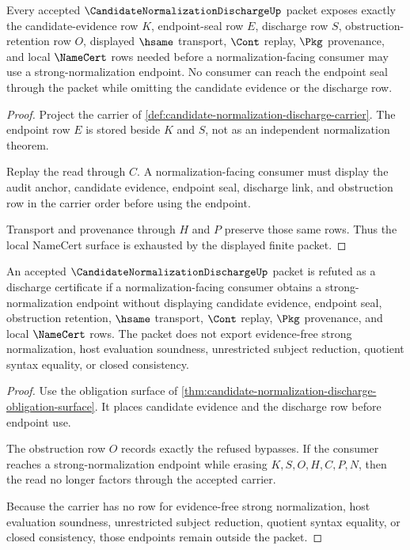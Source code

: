 \begin{theorem}
\label{thm:candidate-normalization-discharge-obligation-surface}
Every accepted $\CandidateNormalizationDischargeUp$ packet exposes exactly the candidate-evidence row $K$, endpoint-seal row $E$, discharge row $S$, obstruction-retention row $O$, displayed $\hsame$ transport, $\Cont$ replay, $\Pkg$ provenance, and local $\NameCert$ rows needed before a normalization-facing consumer may use a strong-normalization endpoint. No consumer can reach the endpoint seal through the packet while omitting the candidate evidence or the discharge row.
\end{theorem}
\begin{proof}
Project the carrier of \autoref{def:candidate-normalization-discharge-carrier}. The endpoint row $E$ is stored beside $K$ and $S$, not as an independent normalization theorem.

Replay the read through $C$. A normalization-facing consumer must display the audit anchor, candidate evidence, endpoint seal, discharge link, and obstruction row in the carrier order before using the endpoint.

Transport and provenance through $H$ and $P$ preserve those same rows. Thus the local NameCert surface is exhausted by the displayed finite packet.
\end{proof}

\begin{theorem}
\label{thm:candidate-normalization-discharge-endpoint-seal-nonescape}
An accepted $\CandidateNormalizationDischargeUp$ packet is refuted as a discharge certificate if a normalization-facing consumer obtains a strong-normalization endpoint without displaying candidate evidence, endpoint seal, obstruction retention, $\hsame$ transport, $\Cont$ replay, $\Pkg$ provenance, and local $\NameCert$ rows. The packet does not export evidence-free strong normalization, host evaluation soundness, unrestricted subject reduction, quotient syntax equality, or closed consistency.
\end{theorem}
\begin{proof}
Use the obligation surface of \autoref{thm:candidate-normalization-discharge-obligation-surface}. It places candidate evidence and the discharge row before endpoint use.

The obstruction row $O$ records exactly the refused bypasses. If the consumer reaches a strong-normalization endpoint while erasing $K,S,O,H,C,P,N$, then the read no longer factors through the accepted carrier.

Because the carrier has no row for evidence-free strong normalization, host evaluation soundness, unrestricted subject reduction, quotient syntax equality, or closed consistency, those endpoints remain outside the packet.
\end{proof}

